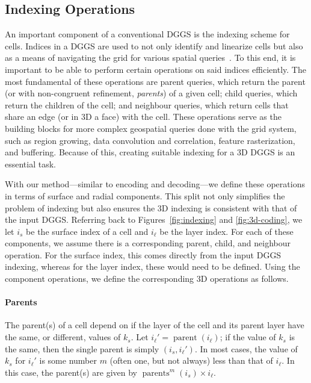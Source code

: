 \subsection{Indexing Operations}
An important component of a conventional DGGS is the indexing scheme for cells.
Indices in a DGGS are used to not only identify and linearize cells but also as a means of navigating the grid for various spatial queries~\cite{alderson2020digital}.
To this end, it is important to be able to perform certain operations on said indices efficiently.
The most fundamental of these operations are parent queries, which return the parent (or with non-congruent refinement, \textit{parents}) of a given cell; child queries, which return the children of the cell; and neighbour queries, which return cells that share an edge (or in 3D a face) with the cell.
These operations serve as the building blocks for more complex geospatial queries done with the grid system, such as region growing, data convolution and correlation, feature rasterization, and buffering.
Because of this, creating suitable indexing for a 3D DGGS is an essential task.


With our method---similar to encoding and decoding---we define these operations in terms of surface and radial components.
This split not only simplifies the problem of indexing but also ensures the 3D indexing is consistent with that of the input DGGS.
Referring back to Figures~\ref{fig:indexing} and \ref{fig:3d-coding}, we let $i_s$ be the surface index of a cell and $i_\ell$ be the layer index.
For each of these components, we assume there is a corresponding parent, child, and neighbour operation.
For the surface index, this comes directly from the input DGGS indexing, whereas for the layer index, these would need to be defined.
Using the component operations, we define the corresponding 3D operations as follows.


\paragraph{Parents}
The parent(s) of a cell depend on if the layer of the cell and its parent layer have the same, or different, values of $k_s$.
Let $i_\ell' = \operatorname{parent}(i_\ell)$; if the value of $k_s$ is the same, then the single parent is simply $(i_s, i_\ell')$.
In most cases, the value of $k_s$ for $i_\ell'$ is some number $m$ (often one, but not always) less than that of $i_\ell$.
In this case, the parent(s) are given by $\operatorname{parents}^m(i_s) \times i_\ell$.


